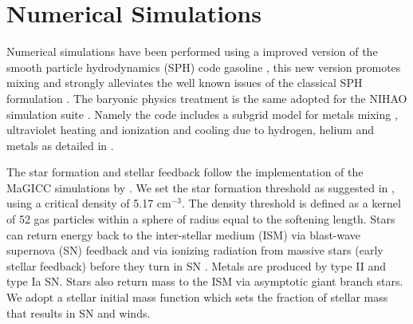 \documentclass[useAMS,usenatbib]{mnras}
\newcommand{\Rvir}	{\ifmmode R_{\mathrm{vir}} \else $R_{\mathrm{vir}}$\fi}
\begin{document}
\begin{table*}
\begin{tabular}{l|c|c|c|c|c|c|c|c|c|c|c}
\hline
\end{tabular}
\caption{Simulations run for this analysis and their respective
  parameters: $T_{\rm off}$, the temperature above which gas cooling
  was turned off; $M_{\rm vir}$, the virialised mass at $z=0$;
 {$M_{\star}$, the stellar mass inside 0.1\Rvir~ at $z=0$; $R_{\rm
    vir}$, the radius at $z=0$ enclosing 200 times the critical density;} $m_{\rm
    dark}$, the mass of a dark matter particle in the zoom-in region;
  $m_{\rm gas}$, the mass of a gas particle in the zoom-in region;
  $\epsilon_{\rm dark}$, the dark matter particle softening length;
  $\epsilon_{\rm gas}$, the minimum gas particle smoothing length; $N_{\rm
    dark}$, the number of dark matter particles in the zoom-in region;
  $N_{\rm gas}$, the number of gas particles in the simulation. {The
  table is divided into three sections: The first five simultions are the
ones we will focus on most in the analysis. The second group of three
are the control simulations for our three initial conditions and the
third group of five are low resolution simulations we ran to test
various parameter choices.}}
\label{tab:sims}
\end{table*}
%
%
\section{Numerical Simulations}
\label{sec:model}

Numerical simulations have been performed  using a improved version of
the smooth  particle hydrodynamics (SPH) code  {\sc gasoline}
\citep{Wadsley2004,  Keller2014},  this new version  promotes mixing
and strongly  alleviates the  well known issues  of the  classical SPH
formulation \citep{Agertz2007}.
The  baryonic physics  treatment is  the  same adopted  for the NIHAO
simulation suite \citep{Wang2015}. Namely the code includes a subgrid
model for metals mixing \citep{Wadsley2008}, ultraviolet heating and
ionization and cooling due to  hydrogen, helium and metals as detailed
in \citet{Shen2010}.

The star formation  and stellar feedback follow  the implementation of
the MaGICC  simulations by  \citet{Stinson2013}. We set the star
formation threshold as suggested in \citet{Wang2015}, using a critical density of 5.17 cm$^{-3}$. The density threshold is
defined as a kernel of 52 gas particles within a sphere of radius
equal to the softening length. Stars can return
energy back to the inter-stellar medium (ISM) via blast-wave supernova
(SN) feedback  \citep{Stinson2006} and  via ionizing  radiation from
massive stars (early stellar feedback) before they turn in SN
\citep{Stinson2013}.  Metals are produced by  type II and type  Ia SN.
Stars also return  mass to the  ISM via  asymptotic giant branch
stars.  We adopt a \citet{Chabrier2003} stellar initial mass function
which sets the fraction of stellar mass that results in SN and winds.
\end{document}
